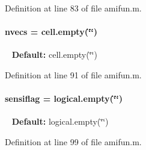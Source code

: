 Definition at line 83 of file amifun.\+m.

\hypertarget{classamifun_a019d960f3d1c1c819a7f3fc90f952c4b}{}
\paragraph[{nvecs}]{\setlength{\rightskip}{0pt plus 5cm}nvecs = cell.\+empty(\char`\"{}\char`\"{})}\label{classamifun_a019d960f3d1c1c819a7f3fc90f952c4b}
~\newline
{\bfseries Default\+:} cell.\+empty(\char`\"{}\char`\"{}) 

Definition at line 91 of file amifun.\+m.

\hypertarget{classamifun_ad8930a02bca1d5facc6203b722d5349d}{}
\paragraph[{sensiflag}]{\setlength{\rightskip}{0pt plus 5cm}sensiflag = logical.\+empty(\char`\"{}\char`\"{})}\label{classamifun_ad8930a02bca1d5facc6203b722d5349d}
~\newline
{\bfseries Default\+:} logical.\+empty(\char`\"{}\char`\"{}) 

Definition at line 99 of file amifun.\+m.

